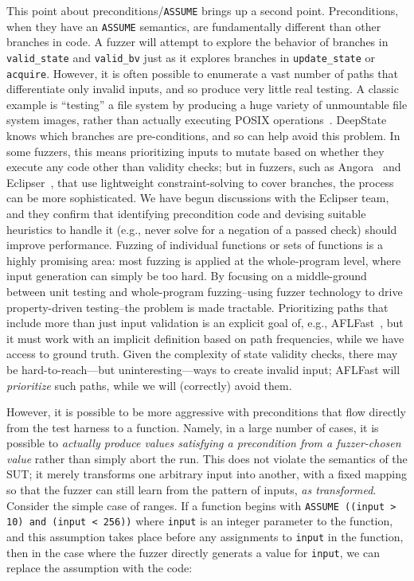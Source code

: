  This point about preconditions/{\tt ASSUME} brings up a second point.  Preconditions, when they have an {\tt ASSUME} semantics, are fundamentally different than other branches in code.  A fuzzer will attempt to explore the behavior of branches in {\tt valid\_state} and {\tt valid\_bv} just as it explores branches in {\tt update\_state} or {\tt acquire}.  However, it is often possible to enumerate a vast number of paths that differentiate only invalid inputs, and so produce very little real testing.  A classic example is ``testing'' a file system by producing a huge variety of unmountable file system images, rather than actually executing POSIX operations~\cite{CFV08,AMAI}.  DeepState knows which branches are pre-conditions, and so can help avoid this problem.  In some fuzzers, this means prioritizing inputs to mutate based on whether they execute any code other than validity checks; but in fuzzers, such as Angora~\cite{angora} and Eclipser~\cite{eclipser}, that use lightweight constraint-solving to cover branches, the process can be more sophisticated.  We have begun discussions with the Eclipser team, and they confirm that identifying precondition code and devising suitable heuristics to handle it (e.g., never solve for a negation of a passed check) should improve performance.  Fuzzing of individual functions or sets of functions is a highly promising area: most fuzzing is applied at the whole-program level, where input generation can simply be too hard.  By focusing on a middle-ground between unit testing and whole-program fuzzing--using fuzzer technology to drive property-driven testing--the problem is made tractable.  Prioritizing paths that include more than just input validation is an explicit goal of, e.g., AFLFast~\cite{aflfast}, but it must work with an implicit definition based on path frequencies, while we have access to ground truth.  Given the complexity of state validity checks, there may be hard-to-reach---but uninteresting---ways to create invalid input; AFLFast will \emph{prioritize} such paths, while we will (correctly) avoid them.

  However, it is possible to be more aggressive with preconditions that flow directly from the test harness to a function.  Namely, in a large number of cases, it is possible to \emph{actually produce values satisfying a precondition from a fuzzer-chosen value} rather than simply abort the run.  This does not violate the semantics of the SUT; it merely transforms one arbitrary input into another, with a fixed mapping so that the fuzzer can still learn from the pattern of inputs, \emph{as transformed}.  Consider the simple case of ranges.  If a function begins with {\tt ASSUME ((input > 10) and (input < 256))} where {\tt input} is an integer parameter to the function, and this assumption takes place before any assignments to {\tt input} in the function, then in the case where the fuzzer directly generats a value for {\tt input}, we can replace the assumption with the code:

